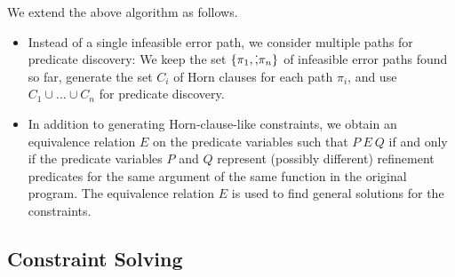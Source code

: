 We extend the above algorithm as follows.
\begin{itemize}
\item Instead of a single infeasible error path, we consider multiple 
paths for predicate discovery:  We keep the set 
\(\{{\pi_1,\dot,\pi_n}\}\) of infeasible error paths found so far, 
generate the set \(C_i\) of Horn clauses for each path \(\pi_i\), and 
use \(C_1 \cup \dots \cup C_n\) for predicate discovery.
\item In addition to generating Horn-clause-like constraints, we obtain 
an equivalence relation \(E\) on the predicate variables such that \(P\ 
E\ Q\) if and only if the predicate variables \(P\) and \(Q\) represent 
(possibly different) refinement predicates for the same argument of the 
same function in the original program.  \todo{an example}  The 
equivalence relation \(E\) is used to find general solutions for the 
constraints.
\end{itemize}





\subsection{Constraint Solving}
\label{sec:cs}

